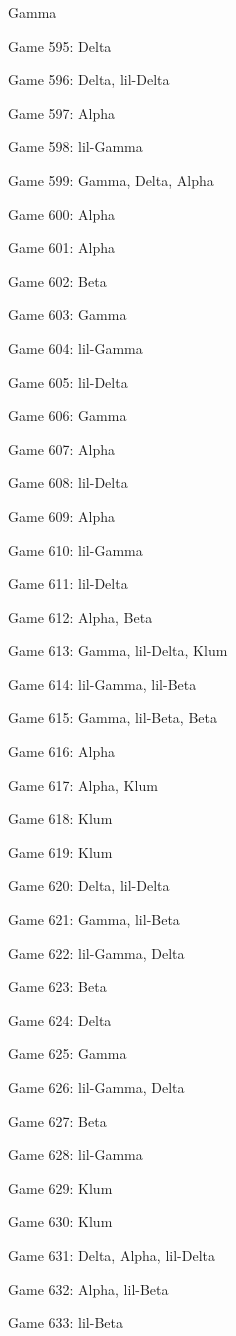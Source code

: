 \documentclass{article}
\begin{document}
\begin{multicols}{3}
\begin{compactitem}
Gamma
\item Game 595:
Delta
\item Game 596:
Delta, lil-Delta
\item Game 597:
Alpha
\item Game 598:
lil-Gamma
\item Game 599:
Gamma, Delta, Alpha
\item Game 600:
Alpha
\item Game 601:
Alpha
\item Game 602:
Beta
\item Game 603:
Gamma
\item Game 604:
lil-Gamma
\item Game 605:
lil-Delta
\item Game 606:
Gamma
\item Game 607:
Alpha
\item Game 608:
lil-Delta
\item Game 609:
Alpha
\item Game 610:
lil-Gamma
\item Game 611:
lil-Delta
\item Game 612:
Alpha, Beta
\item Game 613:
Gamma, lil-Delta, Klum
\item Game 614:
lil-Gamma, lil-Beta
\item Game 615:
Gamma, lil-Beta, Beta
\item Game 616:
Alpha
\item Game 617:
Alpha, Klum
\item Game 618:
Klum
\item Game 619:
Klum
\item Game 620:
Delta, lil-Delta
\item Game 621:
Gamma, lil-Beta
\item Game 622:
lil-Gamma, Delta
\item Game 623:
Beta
\item Game 624:
Delta
\item Game 625:
Gamma
\item Game 626:
lil-Gamma, Delta
\item Game 627:
Beta
\item Game 628:
lil-Gamma
\item Game 629:
Klum
\item Game 630:
Klum
\item Game 631:
Delta, Alpha, lil-Delta
\item Game 632:
Alpha, lil-Beta
\item Game 633:
lil-Beta

\end{compactitem}
\end{multicols}
\end{document}
